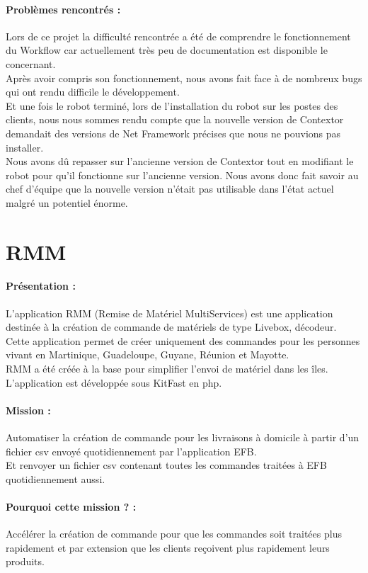 \documentclass[a4paper,twoside,12pt,openright]{report}
\begin{document}
\paragraph {Problèmes rencontrés :} 
Lors de ce projet la difficulté rencontrée a été de comprendre le fonctionnement du Workflow car actuellement très peu de documentation est disponible le concernant.\\ Après avoir compris son fonctionnement, nous avons fait face à de nombreux bugs qui ont rendu difficile le développement.\\
Et une fois le robot terminé, lors de l'installation du robot sur les postes des clients, nous nous sommes rendu compte que la nouvelle version de Contextor demandait des versions de Net Framework précises que nous ne pouvions pas installer.\\
Nous avons dû repasser sur l'ancienne version de Contextor tout en modifiant le robot pour qu'il fonctionne sur l'ancienne version. Nous avons donc fait savoir au chef d'équipe que la nouvelle version n'était pas utilisable dans l'état actuel malgré un potentiel énorme.
\newpage
\section{RMM}
\vspace{1cm}
\paragraph {Présentation :}
L'application RMM (Remise de Matériel MultiServices) est une application destinée à la création de commande de matériels de type Livebox, décodeur.\\
Cette application permet de créer uniquement des commandes pour les personnes vivant en Martinique, Guadeloupe, Guyane, Réunion et Mayotte.\\
RMM a été créée à la base pour simplifier l'envoi de matériel dans les îles.\\
L'application est développée sous KitFast en php. 
\paragraph {Mission :} 
Automatiser la création de commande pour les livraisons à domicile à partir d'un fichier csv envoyé quotidiennement par l'application EFB.\\
Et renvoyer un fichier csv contenant toutes les commandes traitées à EFB quotidiennement aussi.
\paragraph {Pourquoi cette mission ? :}
Accélérer la création de commande pour que les commandes soit traitées plus rapidement et par extension que les clients reçoivent plus rapidement leurs produits.
\end{document}

